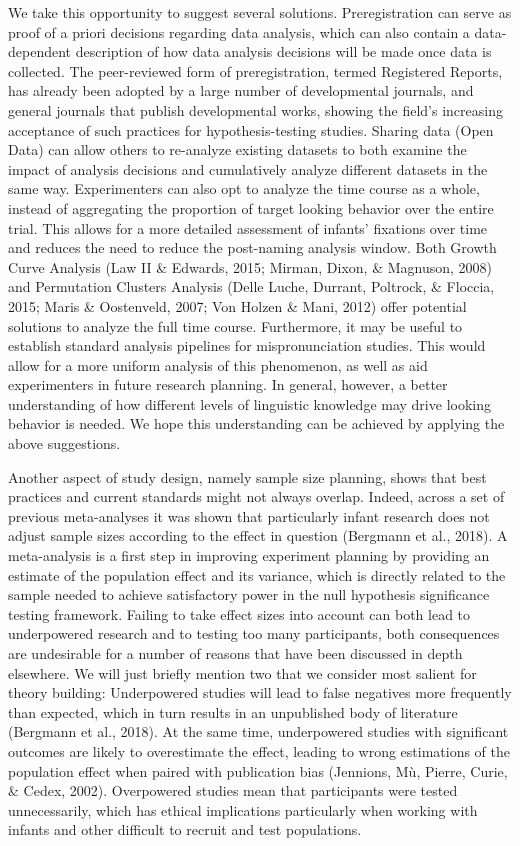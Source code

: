 \documentclass[man]{apa6}
\theoremstyle{definition}
\theoremstyle{definition}
\theoremstyle{definition}
\theoremstyle{remark}
\begin{document}
We take this opportunity to suggest several solutions. Preregistration
can serve as proof of a priori decisions regarding data analysis, which
can also contain a data-dependent description of how data analysis
decisions will be made once data is collected. The peer-reviewed form of
preregistration, termed Registered Reports, has already been adopted by
a large number of developmental journals, and general journals that
publish developmental works, showing the field's increasing acceptance
of such practices for hypothesis-testing studies. Sharing data (Open
Data) can allow others to re-analyze existing datasets to both examine
the impact of analysis decisions and cumulatively analyze different
datasets in the same way. Experimenters can also opt to analyze the time
course as a whole, instead of aggregating the proportion of target
looking behavior over the entire trial. This allows for a more detailed
assessment of infants' fixations over time and reduces the need to
reduce the post-naming analysis window. Both Growth Curve Analysis (Law
II \& Edwards, 2015; Mirman, Dixon, \& Magnuson, 2008) and Permutation
Clusters Analysis (Delle Luche, Durrant, Poltrock, \& Floccia, 2015;
Maris \& Oostenveld, 2007; Von Holzen \& Mani, 2012) offer potential
solutions to analyze the full time course. Furthermore, it may be useful
to establish standard analysis pipelines for mispronunciation studies.
This would allow for a more uniform analysis of this phenomenon, as well
as aid experimenters in future research planning. In general, however, a
better understanding of how different levels of linguistic knowledge may
drive looking behavior is needed. We hope this understanding can be
achieved by applying the above suggestions.

Another aspect of study design, namely sample size planning, shows that
best practices and current standards might not always overlap. Indeed,
across a set of previous meta-analyses it was shown that particularly
infant research does not adjust sample sizes according to the effect in
question (Bergmann et al., 2018). A meta-analysis is a first step in
improving experiment planning by providing an estimate of the population
effect and its variance, which is directly related to the sample needed
to achieve satisfactory power in the null hypothesis significance
testing framework. Failing to take effect sizes into account can both
lead to underpowered research and to testing too many participants, both
consequences are undesirable for a number of reasons that have been
discussed in depth elsewhere. We will just briefly mention two that we
consider most salient for theory building: Underpowered studies will
lead to false negatives more frequently than expected, which in turn
results in an unpublished body of literature (Bergmann et al., 2018). At
the same time, underpowered studies with significant outcomes are likely
to overestimate the effect, leading to wrong estimations of the
population effect when paired with publication bias (Jennions, Mù,
Pierre, Curie, \& Cedex, 2002). Overpowered studies mean that
participants were tested unnecessarily, which has ethical implications
particularly when working with infants and other difficult to recruit
and test populations.
\end{document}
